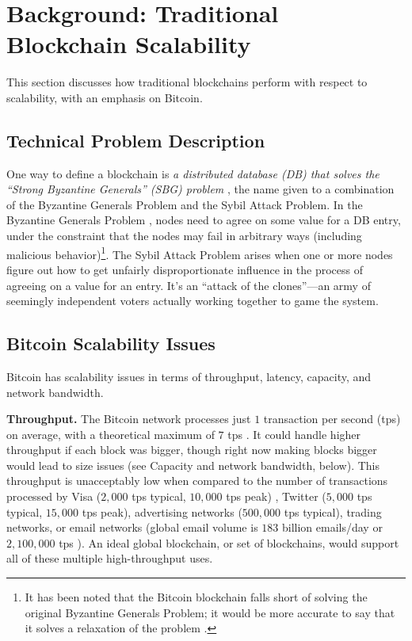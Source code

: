 \section{Background: Traditional Blockchain Scalability}\label{sec:background}

This section discusses how traditional blockchains perform with respect to scalability, with an emphasis on Bitcoin.

\subsection{Technical Problem Description}
One way to define a blockchain is \emph{a distributed database (DB) that solves the “Strong Byzantine Generals” (SBG) problem} \cite{koshy2014revolution}, the name given to a combination of the Byzantine Generals Problem and the Sybil Attack Problem.
In the Byzantine Generals Problem \cite{lamport1982byzantine}, nodes need to agree on some value for a DB entry, under the constraint that the nodes may fail in arbitrary ways (including malicious behavior)\footnote{It has been noted that the Bitcoin blockchain falls short of solving the original Byzantine Generals Problem; it would be more accurate to say that it solves a relaxation of the problem \cite{garay2015bitcoin, luuscp}.}.
The Sybil Attack Problem \cite{douceur2002sybil} arises when one or more nodes figure out how to get unfairly disproportionate influence in the process of agreeing on a value for an entry.
It’s an “attack of the clones”—an army of seemingly independent voters actually working together to game the system.

\subsection{Bitcoin Scalability Issues}
Bitcoin has scalability issues in terms of throughput, latency, capacity, and network bandwidth.

\medskip
\noindent\textbf{Throughput.} The Bitcoin network processes just $1$ transaction per second (tps) on average, with a theoretical maximum of $7$ tps \cite{bitcoin2015scalability}.
It could handle higher throughput if each block was bigger, though right now making blocks bigger would lead to size issues (see Capacity and network bandwidth, below).
This throughput is unacceptably low when compared to the number of transactions processed by Visa ($2,000$ tps typical, $10,000$ tps peak) \cite{trillo2013visa}, Twitter ($5,000$ tps typical, $15,000$ tps peak), advertising networks ($500,000$ tps typical), trading networks, or email networks (global email volume is $183$ billion emails/day or $2,100,000$ tps \cite{sourabh2014email}).
An ideal global blockchain, or set of blockchains, would support all of these multiple high-throughput uses.

